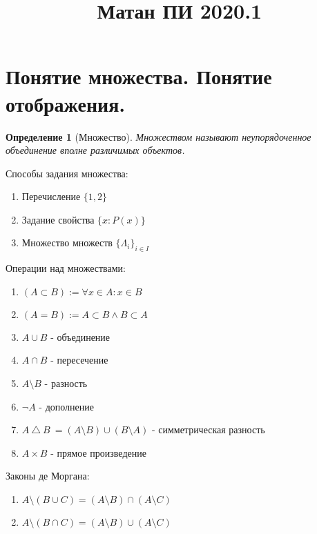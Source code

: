 \documentclass[12pt, a4]{article}
\title{Матан ПИ 2020.1}
\author{}
\newtheorem*{definition}{Определение}
\begin{document}
\onehalfspacing

\maketitle
\tableofcontents

\section{Понятие множества. Понятие отображения.}

\begin{definition}[Множество]
 Множеством называют неупорядоченное объединение вполне различимых объектов.
\end{definition}

\bigskip

Способы задания множества:
\begin{enumerate}
    \item Перечисление \(\{1, 2\}\)
    \item Задание свойства \(\{x : P(x)\}\)
    \item Множество множеств \(\{\Lambda_i\}_{i \in I}\)
\end{enumerate}

\bigskip

Операции над множествами:
\begin{enumerate}
    \item \((A \subset B) := \forall x \in A : x \in B \)
    \item \((A = B) := A \subset B \land B \subset A\)
    \item \(A \cup B\) - объединение
    \item \(A \cap B\) - пересечение
    \item \(A \setminus B\) - разность
    \item \(\neg A\) - дополнение
    \item \(A \  \triangle \  B\ = (A \setminus B) \cup (B \setminus A) \) - симметрическая разность
    \item \(A \times B\) - прямое произведение
\end{enumerate}

\bigskip

Законы де Моргана:
\begin{enumerate}
    \item \(A \setminus (B \cup C) = (A \setminus B) \cap (A \setminus C)\)
    \item \(A \setminus (B \cap C) = (A \setminus B) \cup (A \setminus C)\)
\end{enumerate}
\end{document}
